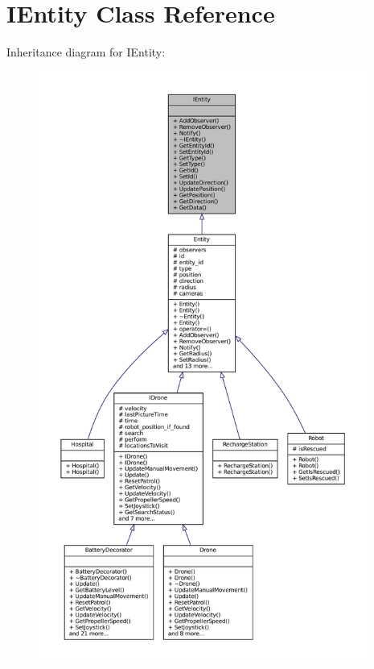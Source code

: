 \hypertarget{classIEntity}{}\section{I\+Entity Class Reference}
\label{classIEntity}


Inheritance diagram for I\+Entity\+:\nopagebreak
\begin{figure}[H]
\begin{center}
\leavevmode
\includegraphics[height=550pt]{classIEntity__inherit__graph}
\end{center}
\end{figure}


